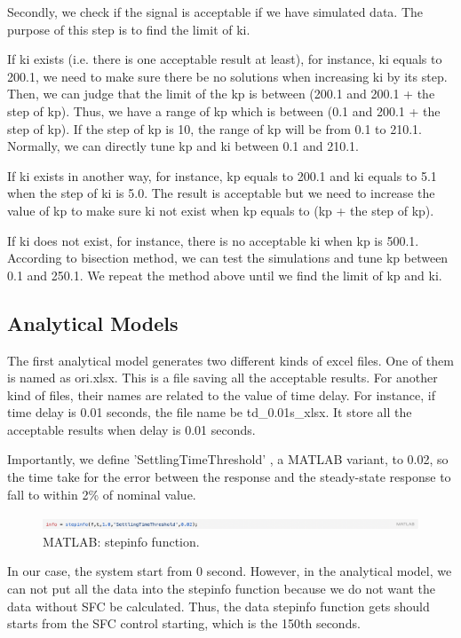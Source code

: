 Secondly, we check if the signal is acceptable if we have simulated data. The purpose of this step is to find the limit of ki. 

If ki exists (i.e. there is one acceptable result at least), for instance, ki equals to 200.1, we need to make sure there be no solutions when increasing ki by its step. Then, we can judge that the limit of the kp is between (200.1 and 200.1 + the step of kp). Thus, we have a range of kp which is between (0.1 and 200.1 + the step of kp). If the step of kp is 10, the range of kp will be from 0.1 to 210.1. Normally, we can directly tune kp and ki between 0.1 and 210.1. 

If ki exists in another way, for instance, kp equals to 200.1 and ki equals to 5.1 when the step of ki is 5.0. The result is acceptable but we need to increase the value of kp to make sure ki not exist when kp equals to (kp + the step of kp). 

If ki does not exist, for instance, there is no acceptable ki when kp is 500.1. According to bisection method, we can test the simulations and tune kp between 0.1 and 250.1. We repeat the method above until we find the limit of kp and ki. 


\subsection{Analytical Models} %
\label{subsection3.4.2}
The first analytical model generates two different kinds of excel files. One of them is named as ori.xlsx. This is a file saving all the acceptable results. For another kind of files, their names are related to the value of time delay. For instance, if time delay is 0.01 seconds, the file name be td\_0.01s\_xlsx. It store all the acceptable results when delay is 0.01 seconds. 

Importantly, we define 'SettlingTimeThreshold' , a MATLAB variant, to 0.02, so the time take for the error between the response and the steady-state response to fall to within 2\% of nominal value. 

\begin{figure}[htbp]
\centering
\includegraphics[width = .999\textwidth]{figure/3_4_2_code4.png}
\caption{MATLAB: stepinfo function.}
\label{3_4_2_code4}
\end{figure}

In our case, the system start from 0 second. However, in the analytical model, we can not put all the data into the stepinfo function because we do not want the data without SFC be calculated. Thus, the data stepinfo function gets should starts from the SFC control starting, which is the 150th seconds.  

